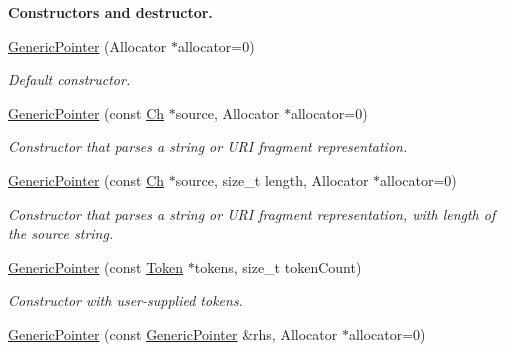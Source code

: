 \begin{Indent}{\bf Constructors and destructor.}\par
\begin{DoxyCompactItemize}
\item 
\hyperlink{classGenericPointer_a5d85b7dc82719643e8f7adccd5a74fbe}{Generic\+Pointer} (Allocator $\ast$allocator=0)\hypertarget{classGenericPointer_a5d85b7dc82719643e8f7adccd5a74fbe}{}\label{classGenericPointer_a5d85b7dc82719643e8f7adccd5a74fbe}

\begin{DoxyCompactList}\small\item\em Default constructor. \end{DoxyCompactList}\item 
\hyperlink{classGenericPointer_a4ad549b8a826c3c2dedf03fcc07be9b0}{Generic\+Pointer} (const \hyperlink{classGenericPointer_ab292356c11b4015c98d21b966b11f285}{Ch} $\ast$source, Allocator $\ast$allocator=0)
\begin{DoxyCompactList}\small\item\em Constructor that parses a string or U\+RI fragment representation. \end{DoxyCompactList}\item 
\hyperlink{classGenericPointer_a9c05684ea95306aac7626e70cb3946cc}{Generic\+Pointer} (const \hyperlink{classGenericPointer_ab292356c11b4015c98d21b966b11f285}{Ch} $\ast$source, size\+\_\+t length, Allocator $\ast$allocator=0)
\begin{DoxyCompactList}\small\item\em Constructor that parses a string or U\+RI fragment representation, with length of the source string. \end{DoxyCompactList}\item 
\hyperlink{classGenericPointer_a524a9921eff68f389a817a20ca7f1d84}{Generic\+Pointer} (const \hyperlink{structGenericPointer_1_1Token}{Token} $\ast$tokens, size\+\_\+t token\+Count)
\begin{DoxyCompactList}\small\item\em Constructor with user-\/supplied tokens. \end{DoxyCompactList}\item 
\hyperlink{classGenericPointer_a18d671bb793c6b843d5496b2b130cb70}{Generic\+Pointer} (const \hyperlink{classGenericPointer}{Generic\+Pointer} \&rhs, Allocator $\ast$allocator=0)\hypertarget{classGenericPointer_a18d671bb793c6b843d5496b2b130cb70}{}\label{classGenericPointer_a18d671bb793c6b843d5496b2b130cb70}


\end{DoxyCompactItemize}
\end{Indent}
